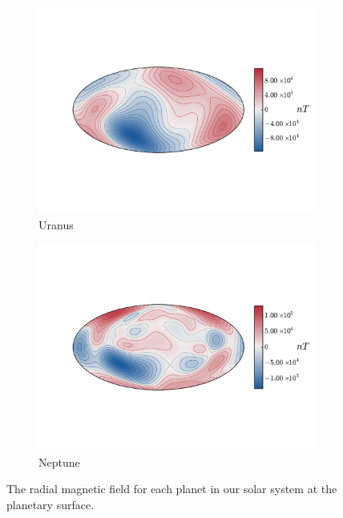 \begin{figure}
        	\begin{subfigure}[b]{0.47\textwidth}
                \includegraphics[width=\textwidth]{Chapter1/Figures/Uranus.pdf}
                \caption{Uranus \citep{holme1996}}
                \label{fig:Uranusbr}
        \end{subfigure}
        	\begin{subfigure}[b]{0.47\textwidth}
                \includegraphics[width=\textwidth]{Chapter1/Figures/Neptune.pdf}
                \caption{Neptune \citep{holme1996}}
                \label{fig:Neptunebr}
        \end{subfigure}
        \caption{The radial magnetic field for each planet in our solar system at the planetary surface.}
\end{figure}

